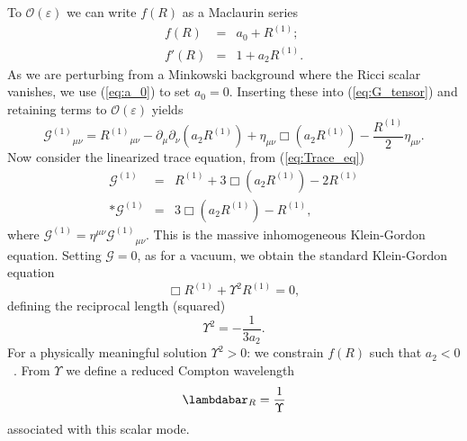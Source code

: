 \documentclass[aps,prd,amsfonts,amssymb,amsmath,nofootinbib,reprint,showpacs]{revtex4-1}
\newcommand{\eqnref}[1]{(\ref{eq:#1})}
\newcommand{\recip}[1]{\ensuremath{\frac{1}{#1}}}
\newcommand{\order}[1]{\ensuremath{\mathcal{O}({#1})}}
\begin{document}
To $\order{\varepsilon}$ we can write $f(R)$ as a Maclaurin series
\begin{eqnarray}
f(R) & = & a_0 + R^{(1)}; \\
f'(R) & = & 1 + a_2 R^{(1)}.
\end{eqnarray}
As we are perturbing from a Minkowski background where the Ricci scalar vanishes, we use \eqnref{a_0} to set $a_0 = 0$. Inserting these into \eqnref{G_tensor} and retaining terms to $\order{\varepsilon}$ yields
\begin{equation}
{\mathcal{G}^{(1)}}_{\mu\nu} = {R^{(1)}}_{\mu\nu} - \partial_\mu\partial_\nu(a_2 R^{(1)}) + \eta_{\mu\nu}\Box(a_2 R^{(1)}) - \frac{R^{(1)}}{2}\eta_{\mu\nu}.
\label{eq:Field}
\end{equation}
Now consider the linearized trace equation, from \eqnref{Trace_eq}
\begin{eqnarray}
\mathcal{G}^{(1)} & = & R^{(1)} + 3 \Box(a_2 R^{(1)}) - 2 R^{(1)} \nonumber \\*
\mathcal{G}^{(1)} & = & 3 \Box(a_2 R^{(1)}) - R^{(1)},
\label{eq:Box_R}
\end{eqnarray}
where $\mathcal{G}^{(1)} = \eta^{\mu\nu}{\mathcal{G}^{(1)}}_{\mu\nu}$. This is the massive inhomogeneous Klein-Gordon equation. Setting $\mathcal{G} = 0$, as for a vacuum, we obtain the standard Klein-Gordon equation
\begin{equation}
\Box R^{(1)} + \Upsilon^2 R^{(1)} = 0,
\end{equation}
defining the reciprocal length (squared)
\begin{equation}
\Upsilon^2 = -\recip{3a_2}.
\end{equation}
For a physically meaningful solution $\Upsilon^2 > 0$: we constrain $f(R)$ such that $a_2 < 0$~\cite{Schmidt1986, Teyssandier1990, Olmo2005c, Corda2008}. From $\Upsilon$ we define a reduced Compton wavelength
\begin{equation}
\lambdabar_R = \recip{\Upsilon}
\end{equation}
associated with this scalar mode.
\end{document}
